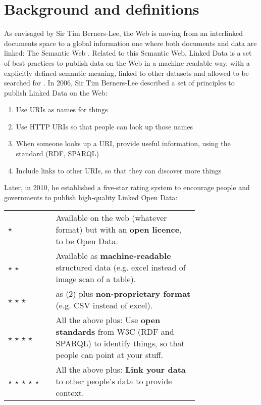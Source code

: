 \section{Background and definitions}
\label{subsec:background}

As envisaged by Sir Tim Berners-Lee, the Web is moving from an interlinked documents space to a global information one where both documents and data are linked: The Semantic Web \cite{berners2001semantic}. Related to this Semantic Web, Linked Data is a set of best practices to publish data on the Web in a machine-readable way, with a explicitly defined semantic meaning, linked to other datasets and allowed to be searched for \cite{bizer2009linked}. In 2006, Sir Tim Berners-Lee described a set of principles to publish Linked Data on the Web:

\begin{enumerate}
  \item Use URIs as names for things
  \item Use HTTP URIs so that people can look up those names
  \item When someone looks up a URI, provide useful information, using the standard (RDF, SPARQL)
  \item Include links to other URIs, so that they can discover more things \\[\baselineskip]
\end{enumerate}

Later, in 2010, he established a five-star rating system to encourage people and governments to publish high-quality Linked Open Data:\\[\baselineskip]

\begin{tabular}{ l p{0.75\linewidth} }
  $\star$ & Available on the web (whatever format) but with an \textbf{open licence}, to be Open Data. \\
  $\star$ $\star$ & Available as \textbf{machine-readable} structured data (e.g. excel instead of image scan of a table). \\
  $\star$ $\star$ $\star$ & as (2) plus \textbf{non-proprietary format} (e.g. CSV instead of excel). \\
  $\star$ $\star$ $\star$ $\star$ & All the above plus: Use \textbf{open standards} from W3C (RDF and SPARQL) to identify things, so that people can point at your stuff. \\
  $\star$ $\star$ $\star$ $\star$ $\star$ & All the above plus: \textbf{Link your data} to other people's data to provide context. \\[\baselineskip]
\end{tabular}

